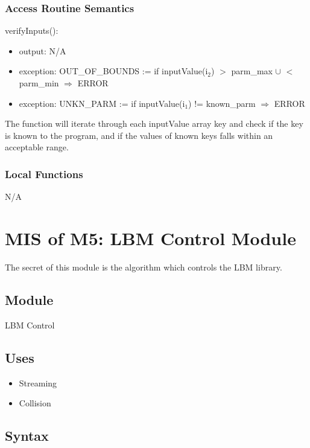 \documentclass[12pt, titlepage]{article}
\begin{document}
\subsubsection{Access Routine Semantics}

\noindent verifyInputs():
\begin{itemize}
	\item output: N/A
	\item exception: OUT\_OF\_BOUNDS := if inputValue(i$_2$) $>$ parm\_max $\cup$ $<$ parm\_min $\Rightarrow$ ERROR
	\item exception: UNKN\_PARM := if inputValue(i$_1$) != known\_parm $\Rightarrow$ ERROR
\end{itemize}

The function will iterate through each inputValue array key and check if the key is known to the program, and if the values of known keys falls within an acceptable range.

\subsubsection{Local Functions}

N/A

\newpage

\section{MIS of M5: LBM Control Module} \label{LCModule}

The secret of this module is the algorithm which controls the LBM library.

\subsection{Module}

LBM Control

\subsection{Uses}

\begin{itemize}
	\item Streaming
	\item Collision
\end{itemize}

\subsection{Syntax}
\end{document}
